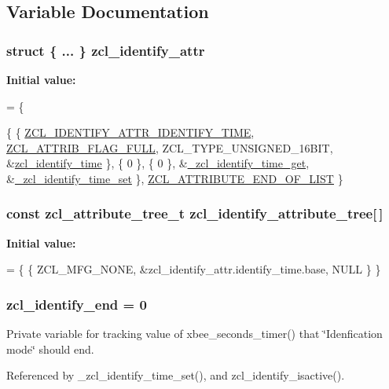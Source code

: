 \subsection{Variable Documentation}
\hypertarget{group__zcl__identify_ga52c9e3d43059dde63b8c638cdb24b900}{
\subsubsection[{zcl\-\_\-identify\-\_\-attr}]{\setlength{\rightskip}{0pt plus 5cm}struct \{ ... \}   zcl\-\_\-identify\-\_\-attr}}\label{group__zcl__identify_ga52c9e3d43059dde63b8c638cdb24b900}
{\bfseries Initial value\-:}
\begin{DoxyCode}
=
\{

   \{ \{ \hyperlink{group__zcl__identify_ga7df877a02f273adc190aa24ad0aff4c9}{ZCL\_IDENTIFY\_ATTR\_IDENTIFY\_TIME},
      \hyperlink{group__zcl_ga40104652d30fa17b7ea5dde9e8b788b8}{ZCL\_ATTRIB\_FLAG\_FULL},
      ZCL\_TYPE\_UNSIGNED\_16BIT,
      &\hyperlink{group__zcl__identify_ga2cb1b23d3ccb08ae200e797358694d51}{zcl\_identify\_time} \},
      \{ 0 \}, \{ 0 \},
      &\hyperlink{group__zcl__identify_ga7cde47425d0a779f5aff87985ea01951}{\_zcl\_identify\_time\_get}, &\hyperlink{group__zcl__identify_ga40470468c9c1fe4ebfb52612234710b0}{\_zcl\_identify\_time\_set}
       \},
   \hyperlink{group__zcl_gab05da20cf1dfaef97e20dfca2fd26d14}{ZCL\_ATTRIBUTE\_END\_OF\_LIST}
\}
\end{DoxyCode}
\hypertarget{group__zcl__identify_gadebf533d91e359185eb3c0e1e7f044d7}{
\subsubsection[{zcl\-\_\-identify\-\_\-attribute\-\_\-tree}]{\setlength{\rightskip}{0pt plus 5cm}const {\bf zcl\-\_\-attribute\-\_\-tree\-\_\-t} zcl\-\_\-identify\-\_\-attribute\-\_\-tree\mbox{[}$\,$\mbox{]}}}\label{group__zcl__identify_gadebf533d91e359185eb3c0e1e7f044d7}
{\bfseries Initial value\-:}
\begin{DoxyCode}
=
      \{ \{ ZCL\_MFG\_NONE, &zcl\_identify\_attr.identify\_time.base, NULL \} \}
\end{DoxyCode}
\hypertarget{group__zcl__identify_ga467ad1e40ea8475b4e49865436883e94}{
\subsubsection[{zcl\-\_\-identify\-\_\-end}]{ zcl\-\_\-identify\-\_\-end = 0}}\label{group__zcl__identify_ga467ad1e40ea8475b4e49865436883e94}


Private variable for tracking value of xbee\-\_\-seconds\-\_\-timer() that \char`\"{}\-Idenfication mode\char`\"{} should end. 



Referenced by \-\_\-zcl\-\_\-identify\-\_\-time\-\_\-set(), and zcl\-\_\-identify\-\_\-isactive().

